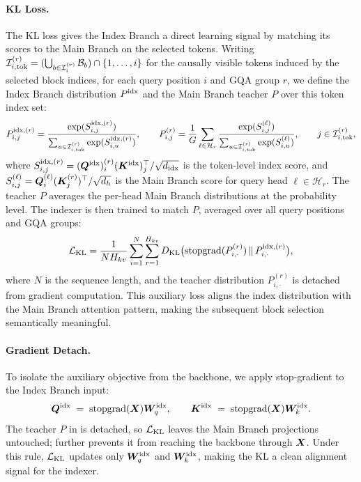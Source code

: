 \paragraph{KL Loss.} The KL loss gives the Index Branch a direct learning signal by matching its scores to the Main Branch on the selected tokens. Writing ${\mathcal{I}}_{i,\mathrm{tok}}^{(r)}=(\bigcup_{b\in{\mathcal{I}}_i^{(r)}}{\mathcal{B}}_b)\cap\{1,\dots,i\}$ for the causally visible tokens induced by the selected block indices, for each query position $i$ and GQA group $r$, we define the Index Branch distribution $P^{\rm idx}$ and the Main Branch teacher $P$ over this token index set:
\begin{equation}
\label{eq:msa-pp}
P^{{\rm idx},(r)}_{i,j}
= \frac{\exp(S^{{\rm idx},(r)}_{i,j})}
       {\sum_{u\in{\mathcal{I}}_{i,\mathrm{tok}}^{(r)}}\exp(S^{{\rm idx},(r)}_{i,u})},
\qquad
P^{(r)}_{i,j}
= \frac{1}{G}\sum_{\ell\in\mathcal{H}_r}
  \frac{\exp(S^{(\ell)}_{i,j})}
       {\sum_{u\in{\mathcal{I}}_{i,\mathrm{tok}}^{(r)}}\exp(S^{(\ell)}_{i,u})},
\qquad j\in{\mathcal{I}}_{i,\mathrm{tok}}^{(r)},
\end{equation}
where $S^{{\rm idx},(r)}_{i,j} = ({\bm{Q}}^{\rm idx})^{(r)}_i({\bm{K}}^{\rm idx})_j^{\top}/\sqrt{d_{\rm idx}}$ is the token-level index score, and $S^{(\ell)}_{i,j} = {\bm{Q}}^{(\ell)}_i({\bm{K}}^{(r)}_j)^{\top}/\sqrt{d_h}$ is the Main Branch score for query head $\ell\in\mathcal{H}_r$. The teacher $P$ averages the per-head Main Branch distributions at the probability level. The indexer is then trained to match $P$, averaged over all query positions and GQA groups:
\begin{equation}
\label{eq:msa-kl}
\mathcal{L}_{\rm KL}
= \frac{1}{NH_{kv}}
  \sum_{i=1}^{N}\sum_{r=1}^{H_{kv}}
  D_{\mathrm{KL}}\bigl(\mathrm{stopgrad}(P^{(r)}_{i,\cdot}) \,\|\, P^{{\rm idx},(r)}_{i,\cdot}\bigr),
\end{equation}
where $N$ is the sequence length, and the teacher distribution $P^{(r)}_{i,\cdot}$ is detached from gradient computation. This auxiliary loss aligns the index distribution with the Main Branch attention pattern, making the subsequent block selection semantically meaningful.




\paragraph{Gradient Detach.} To isolate the auxiliary objective from the backbone, we apply stop-gradient to the Index Branch input:
\begin{equation}
\label{eq:msa-detach}
{\bm{Q}}^{\rm idx} \;=\; \mathrm{stopgrad}({\bm{X}}){\bm{W}}^{\rm idx}_q,
\qquad
{\bm{K}}^{\rm idx} \;=\; \mathrm{stopgrad}({\bm{X}}){\bm{W}}^{\rm idx}_k.
\end{equation}
The teacher $P$ in  is detached, so $\mathcal{L}_{\rm KL}$ leaves the Main Branch projections untouched;  further prevents it from reaching the backbone through ${\bm{X}}$. Under this rule, $\mathcal{L}_{\rm KL}$ updates only ${\bm{W}}^{\rm idx}_q$ and ${\bm{W}}^{\rm idx}_k$, making the KL a clean alignment signal for the indexer.


